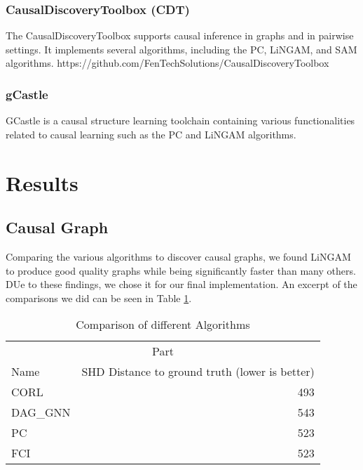 \documentclass{article}
\begin{document}
    
    \subsubsection{CausalDiscoveryToolbox (CDT)}
    The CausalDiscoveryToolbox supports causal inference in graphs and in pairwise settings. It implements several algorithms, including the PC, LiNGAM, and SAM algorithms.
    https://github.com/FenTechSolutions/CausalDiscoveryToolbox 
    \cite{CDT}
    
    \subsubsection{gCastle}
    GCastle is a causal structure learning toolchain containing various functionalities related to causal learning such as the PC and LiNGAM algorithms. 
    \cite{zhang2021gcastlepythontoolboxcausal}
    
    \section{Results} %

    \subsection{Causal Graph}

    Comparing the various algorithms to discover causal graphs, we found LiNGAM to produce good quality graphs while being significantly faster than many others. DUe to these findings, we chose it for our final implementation. An excerpt of the comparisons we did can be seen in Table \ref{comparisonSHD}.

    \begin{table}
		\caption{Comparison of different Algorithms}
		\label{comparisonSHD}
		\centering
		\begin{tabular}{lr}
			\toprule
			\multicolumn{2}{c}{Part}                   \\
			\cmidrule(r){1-2}
			Name     & SHD Distance to ground truth (lower is better)  \\
			\midrule
			CORL  & 493       \\
			DAG\_GNN & 543    \\
			PC & 523     \\
            FCI  & 523 \\
			\bottomrule
		\end{tabular}
	\end{table}
    
\end{document}
